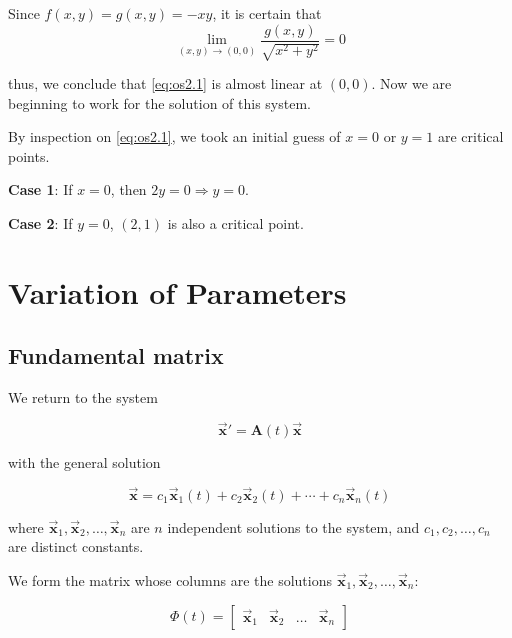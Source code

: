 \begin{solution}
    Since $f(x,y) = g(x,y) = -xy$, it is certain that 
    \begin{equation*}
        \lim_{(x,y) \to (0, 0)} \frac{g(x,y)}{\sqrt{x^2 + y^2}} = 0
    \end{equation*}

    thus, we conclude that \eqref{eq:os2.1} is almost linear at $(0,0)$. Now we are beginning to work for the 
    solution of this system.

    By inspection on \eqref{eq:os2.1}, we took an initial guess of $x = 0$ or $y = 1$ are critical points.

    \textbf{Case 1}: If $x = 0$, then $2y = 0 \Rightarrow y =0$.

    \textbf{Case 2}: If $y = 0$, $(2, 1)$ is also a critical point.
\end{solution}

\section{Variation of Parameters}

\subsection{Fundamental matrix}

We return to the system 

\begin{equation}
    \overrightarrow{\mathbf{x}}' = \mathbf{A}(t) \overrightarrow{\mathbf{x}}
\end{equation}

with the general solution 

\begin{equation}
    \overrightarrow{\mathbf{x}} = c_1 \overrightarrow{\mathbf{x}}_1(t) + c_2 \overrightarrow{\mathbf{x}}_2(t) 
    + \cdots + c_n \overrightarrow{\mathbf{x}}_n(t)
\end{equation}

where $\overrightarrow{\mathbf{x}}_1, \overrightarrow{\mathbf{x}}_2, \ldots, \overrightarrow{\mathbf{x}}_n$ are 
$n$ independent solutions to the system, and $c_1, c_2, \ldots, c_n$ are distinct constants.

We form the matrix whose columns are the solutions $\overrightarrow{\mathbf{x}}_1, \overrightarrow{\mathbf{x}}_2, \ldots, \overrightarrow{\mathbf{x}}_n$:

\begin{equation}
    \Phi(t) = \begin{bmatrix}
        \overrightarrow{\mathbf{x}}_1 & \overrightarrow{\mathbf{x}}_2 & \ldots & \overrightarrow{\mathbf{x}}_n
    \end{bmatrix}
\end{equation}


